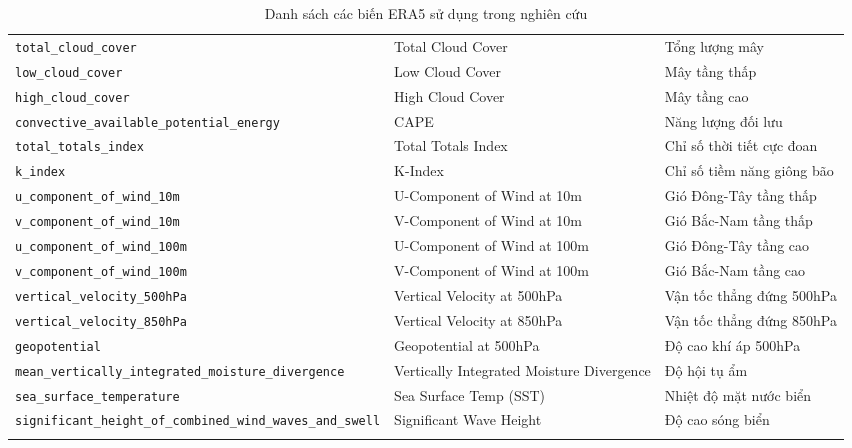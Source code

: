\documentclass[12pt,a4paper]{article}
\begin{document}
\begin{longtable}{|>{\raggedright\arraybackslash}p{}|>{\raggedright\arraybackslash}p{}|>{\raggedright\arraybackslash}p{}|}
\texttt{total\_\allowbreak cloud\_\allowbreak cover} & Total Cloud Cover & Tổng lượng mây \\
\texttt{low\_\allowbreak cloud\_\allowbreak cover} & Low Cloud Cover & Mây tầng thấp \\
\texttt{high\_\allowbreak cloud\_\allowbreak cover} & High Cloud Cover & Mây tầng cao \\
\hline

\texttt{convective\_\allowbreak available\_\allowbreak potential\_\allowbreak energy} & CAPE & Năng lượng đối lưu \\
\texttt{total\_\allowbreak totals\_\allowbreak index} & Total Totals Index & Chỉ số thời tiết cực đoan \\
\texttt{k\_\allowbreak index} & K-Index & Chỉ số tiềm năng giông bão \\
\hline

\texttt{u\_\allowbreak component\_\allowbreak of\_\allowbreak wind\_\allowbreak 10m} & U-Component of Wind at 10m & Gió Đông-Tây tầng thấp \\
\texttt{v\_\allowbreak component\_\allowbreak of\_\allowbreak wind\_\allowbreak 10m} & V-Component of Wind at 10m & Gió Bắc-Nam tầng thấp \\
\texttt{u\_\allowbreak component\_\allowbreak of\_\allowbreak wind\_\allowbreak 100m} & U-Component of Wind at 100m & Gió Đông-Tây tầng cao \\
\texttt{v\_\allowbreak component\_\allowbreak of\_\allowbreak wind\_\allowbreak 100m} & V-Component of Wind at 100m & Gió Bắc-Nam tầng cao \\
\texttt{vertical\_\allowbreak velocity\_\allowbreak 500hPa} & Vertical Velocity at 500hPa & Vận tốc thẳng đứng 500hPa \\
\texttt{vertical\_\allowbreak velocity\_\allowbreak 850hPa} & Vertical Velocity at 850hPa & Vận tốc thẳng đứng 850hPa \\
\texttt{geopotential} & Geopotential at 500hPa & Độ cao khí áp 500hPa \\
\hline

\texttt{mean\_\allowbreak vertically\_\allowbreak integrated\_\allowbreak moisture\_\allowbreak divergence} & Vertically Integrated Moisture Divergence & Độ hội tụ ẩm \\
\hline

\texttt{sea\_\allowbreak surface\_\allowbreak temperature} & Sea Surface Temp (SST) & Nhiệt độ mặt nước biển \\
\texttt{significant\_\allowbreak height\_\allowbreak of\_\allowbreak combined\_\allowbreak wind\_\allowbreak waves\_\allowbreak and\_\allowbreak swell} & Significant Wave Height & Độ cao sóng biển \\
\hline

\caption{Danh sách các biến ERA5 sử dụng trong nghiên cứu}
\end{longtable}
\endgroup
\end{document}
